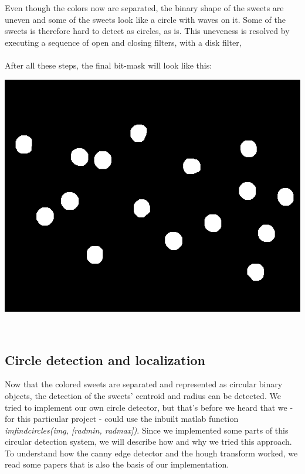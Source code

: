 Even though the colors now are separated, the binary shape of the sweets are uneven and some of the sweets look like a circle with waves on it. Some of the sweets is therefore hard to detect as circles, as is. This uneveness is resolved by executing a sequence of open and closing filters, with a disk filter,
\\

\mbox{}\\
After all these steps, the final bit-mask will look like this:
\\ \newline
\centerline{\includegraphics[scale=0.3]{../results/sweetsA03_blue_sweets.png}}
\mbox{}\\
\subsection{Circle detection and localization}
Now that the colored sweets are separated and represented as circular binary objects, the detection of the sweets' centroid and radius can be detected. We tried to implement our own circle detector, but that's before we heard that we - for this particular project - could use the inbuilt matlab function \emph{imfindcircles(img, [radmin, radmax])}. Since we implemented some parts of this circular detection system, we will describe how and why we tried this approach. To understand how the canny edge detector and the hough transform worked, we read some papers \cite{canny1,hough1} that is also the basis of our implementation.
